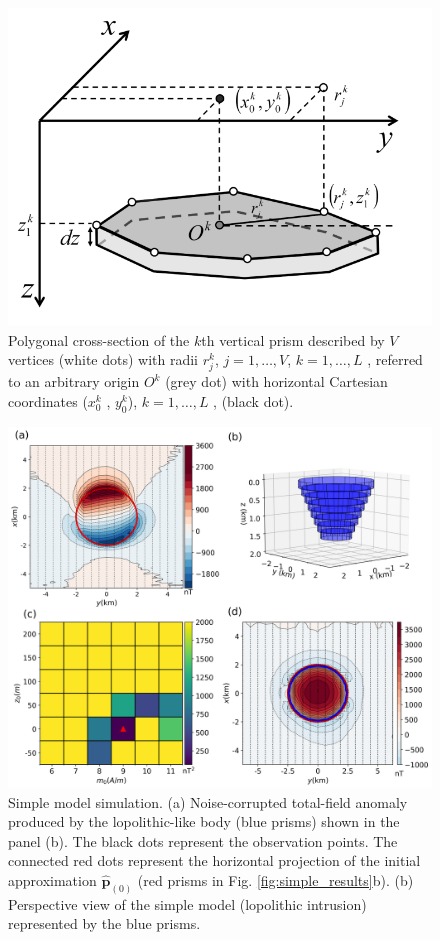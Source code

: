 \begin{figure}
    \centering
    \includegraphics[scale=0.3]{figures/prism_parameters_mod.png}
    \caption{Polygonal cross-section of the $k$th vertical prism described by $V$ vertices (white dots) with radii $r^k_j$, $j = 1, \dots, V$, $k = 1, \dots, L$ , referred to an arbitrary origin $O^k$ (grey dot) with horizontal Cartesian coordinates ($x_0^k$ , $y_0^k$), $k = 1, \dots, L$ , (black dot).}
    \label{fig:prism_parameters}
\end{figure}


\begin{figure}
    \centering
    \includegraphics[width=\linewidth]{figures/simple_model_data.png}
    \caption{Simple model simulation. (a) Noise-corrupted total-field anomaly produced by the lopolithic-like body (blue prisms) shown in the panel (b). The black dots represent the observation points. The connected red dots represent the horizontal projection 
    of the initial approximation $\hat{\mathbf{p}}_{(0)}$
    (red prisms in Fig. \ref{fig:simple_results}b).
    (b) Perspective view of the simple model (lopolithic intrusion) represented by the blue prisms.
}
    \label{fig:simple_model}
\end{figure}


